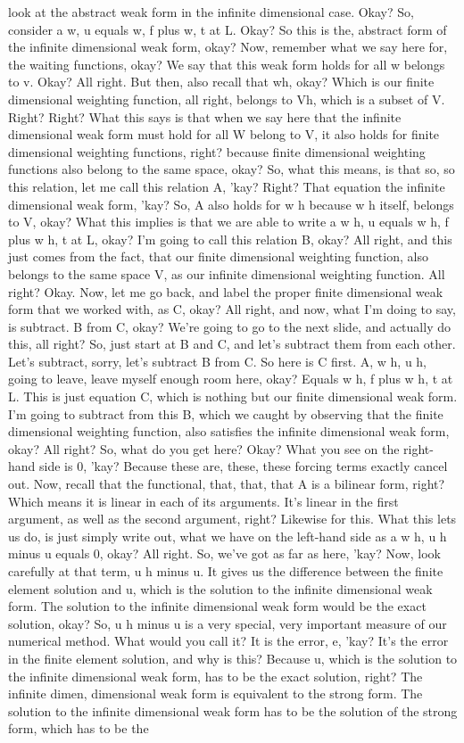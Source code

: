 \documentclass[10pt]{article}
\begin{document}
{look at the abstract weak form in the infinite dimensional case. Okay? So, consider a w, u equals w, f plus w, t at L. Okay? So this is the, abstract form of the infinite dimensional weak form, okay? Now, remember what we say here for, the waiting functions, okay? We say that this weak form holds for all w belongs to v. Okay? All right. But then, also recall that wh, okay? Which is our finite dimensional weighting function, all right, belongs to Vh, which is a subset of V. Right? Right? What this says is that when we say here that the infinite dimensional weak form must hold for all W belong to V, it also holds for finite dimensional weighting functions, right? because finite dimensional weighting functions also belong to the same space, okay? So, what this means, is that so, so this relation, let me call this relation A, 'kay? Right? That equation the infinite dimensional weak form, 'kay? So, A also holds for w h because w h itself, belongs to V, okay? What this implies is that we are able to write a w h, u equals w h, f plus w h, t at L, okay? I'm going to call this relation B, okay? All right, and this just comes from the fact, that our finite dimensional weighting function, also belongs to the same space V, as our infinite dimensional weighting function. All right? Okay. Now, let me go back, and label the proper finite dimensional weak form that we worked with, as C, okay? All right, and now, what I'm doing to say, is subtract. B from C, okay? We're going to go to the next slide, and actually do this, all right? So, just start at B and C, and let's subtract them from each other. Let's subtract, sorry, let's subtract B from C. So here is C first. A, w h, u h, going to leave, leave myself enough room here, okay? Equals w h, f plus w h, t at L. This is just equation C, which is nothing but our finite dimensional weak form. I'm going to subtract from this B, which we caught by observing that the finite dimensional weighting function, also satisfies the infinite dimensional weak form, okay? All right? So, what do you get here? Okay? What you see on the right-hand side is 0, 'kay? Because these are, these, these forcing terms exactly cancel out. Now, recall that the functional, that, that, that A is a bilinear form, right? Which means it is linear in each of its arguments. It's linear in the first argument, as well as the second argument, right? Likewise for this. What this lets us do, is just simply write out, what we have on the left-hand side as a w h, u h minus u equals 0, okay? All right. So, we've got as far as here, 'kay? Now, look carefully at that term, u h minus u. It gives us the difference between the finite element solution and u, which is the solution to the infinite dimensional weak form. The solution to the infinite dimensional weak form would be the exact solution, okay? So, u h minus u is a very special, very important measure of our numerical method. What would you call it? It is the error, e, 'kay? It's the error in the finite element solution, and why is this? Because u, which is the solution to the infinite dimensional weak form, has to be the exact solution, right? The infinite dimen, dimensional weak form is equivalent to the strong form. The solution to the infinite dimensional weak form has to be the solution of the strong form, which has to be the }
\end{document}
